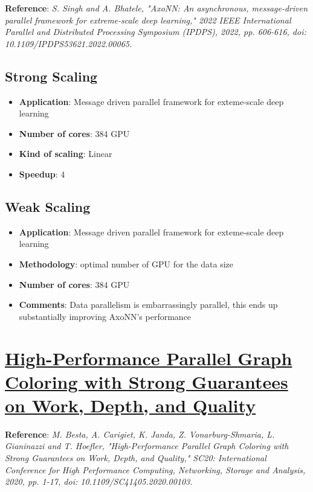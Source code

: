 \documentclass[11pt]{article}
\begin{document}
\textbf{Reference}: \textit{S. Singh and A. Bhatele, "AxoNN: An asynchronous, message-driven parallel framework for extreme-scale deep learning," 2022 IEEE International Parallel and Distributed Processing Symposium (IPDPS), 2022, pp. 606-616, doi: 10.1109/IPDPS53621.2022.00065.}

\subsection*{Strong Scaling}
\label{sec:org2bfbf7b}
\begin{itemize}
\item \textbf{Application}: Message driven parallel framework for exteme-scale deep learning
\item \textbf{Number of cores}: 384 GPU
\item \textbf{Kind of scaling}: Linear
\item \textbf{Speedup}: 4
\end{itemize}

\subsection*{Weak Scaling}
\label{sec:org9db5d54}
\begin{itemize}
\item \textbf{Application}: Message driven parallel framework for exteme-scale deep learning
\item \textbf{Methodology}: optimal number of GPU for the data size
\item \textbf{Number of cores}: 384 GPU
\item \textbf{Comments}:
Data parallelism is embarrassingly parallel, this ends up substantially improving AxoNN's performance
\end{itemize}

\pagebreak
\section{\href{https://ieeexplore.ieee.org/document/9355236}{High-Performance Parallel Graph Coloring with Strong Guarantees on Work, Depth, and Quality}}
\label{sec:org900e9c3}

\textbf{Reference}: \textit{M. Besta, A. Carigiet, K. Janda, Z. Vonarburg-Shmaria, L. Gianinazzi and T. Hoefler, "High-Performance Parallel Graph Coloring with Strong Guarantees on Work, Depth, and Quality," SC20: International Conference for High Performance Computing, Networking, Storage and Analysis, 2020, pp. 1-17, doi: 10.1109/SC41405.2020.00103.}
\end{document}
